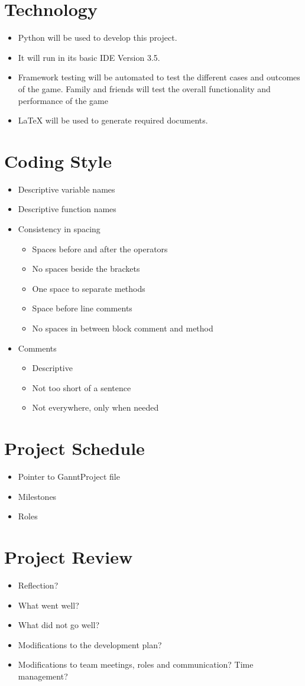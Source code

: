 \documentclass{article}
\begin{document}
\section{Technology}

\begin{itemize}
\item Python will be used to develop this project.
\item It will run in its basic IDE Version 3.5.
\item Framework testing will be automated to test the different cases and outcomes of the game. Family and friends will test the overall functionality and performance of the game
\item LaTeX will be used to generate required documents.
\end{itemize}

\section{Coding Style}

\begin{itemize}
\item Descriptive variable names
\item Descriptive function names
\item Consistency in spacing
\begin{itemize}
\item Spaces before and after the operators
\item No spaces beside the brackets
\item One space to separate methods
\item Space before line comments
\item No spaces in between block comment and method
\end{itemize}
\item Comments
\begin{itemize}
\item Descriptive
\item Not too short of a sentence
\item Not everywhere, only when needed
\end{itemize}
\end{itemize}

\section{Project Schedule}

\begin{itemize}
\item Pointer to GanntProject file
\item Milestones
\item Roles
\end{itemize}

\section{Project Review}

\begin{itemize}
\item Reflection?
\item What went well?
\item  What did not go well?
\item Modifications to the development plan?
\item Modifications to team meetings, roles and communication? Time management?
\end{itemize}
\end{document}
